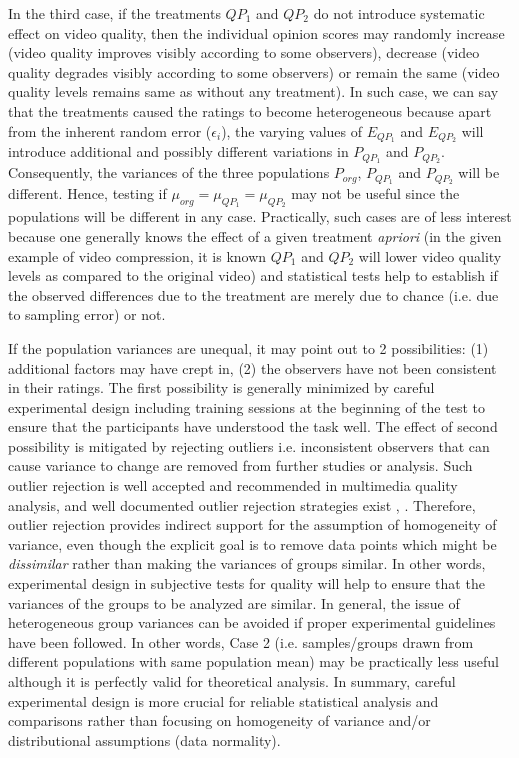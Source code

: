 \documentclass[10pt,final,Twcolumn]{IEEEtran}
\begin{document}
In the third case, if the treatments $QP_1$ and $QP_2$ do not introduce systematic effect on video quality, then the individual opinion scores may randomly increase (video quality improves visibly according to some observers), decrease (video quality degrades visibly according to some observers) or remain the same (video quality levels remains same as without any treatment). In such case, we can say that the treatments caused the ratings to become heterogeneous because apart from the inherent random error ($\epsilon_i$), the varying values of $E_{QP_1}$ and $E_{QP_2}$ will introduce additional and possibly different variations in $P_{QP_1}$ and $P_{QP_2}$. Consequently, the variances of the three populations $P_{org}$, $P_{QP_1}$ and $P_{QP_2}$ will be different. Hence, testing if $\mu_{org} = \mu_{QP_1} = \mu_{QP_2}$ may not be useful since the populations will be different in any case. Practically, such cases are of less interest because one generally knows the effect of a given treatment {\it{apriori}} (in the given example of video compression, it is known $QP_1$ and $QP_2$ will lower video quality levels as compared to the original video) and statistical tests help to establish if the observed differences due to the treatment are merely due to chance (i.e. due to sampling error) or not. 

If the population variances are unequal, it may point out to 2 possibilities: (1) additional factors may have crept in, (2) the observers have not been consistent in their ratings. The first possibility is generally minimized by careful experimental design including training sessions at the beginning of the test to ensure that the participants have understood the task well. The effect of second possibility is mitigated by rejecting outliers i.e. inconsistent observers that can cause variance to change are removed from further studies or analysis. Such outlier rejection is well accepted and recommended in multimedia quality analysis, and well documented outlier rejection strategies exist \cite{15_obs}, \cite{VQEG}. Therefore, outlier rejection provides indirect support for the assumption of homogeneity of variance, even though the explicit goal is to remove data points which might be {\it{dissimilar}} rather than making the variances of groups similar. In other words, experimental design in subjective tests for quality will help to ensure that the variances of the groups to be analyzed are similar. In general, the issue of heterogeneous group variances can be avoided \cite{Sawilowsky2013FermatSE} if proper experimental guidelines have been followed. In other words, Case 2 (i.e. samples/groups drawn from different populations with same population mean) may be practically less useful although it is perfectly valid for theoretical analysis. In summary, careful experimental design is more crucial for reliable statistical analysis and comparisons rather than focusing on homogeneity of variance and/or distributional assumptions (data normality).
\end{document}
